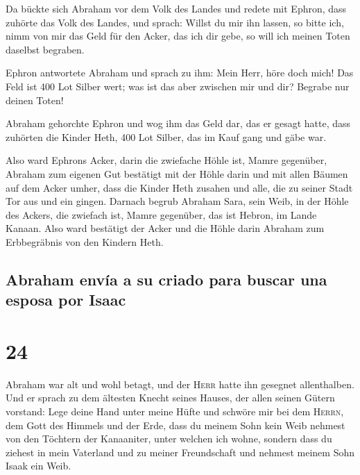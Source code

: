  Da bückte sich Abraham vor dem Volk des Landes
 und redete mit Ephron, dass zuhörte das Volk des Landes,
und sprach: Willst du mir ihn lassen, so bitte ich, nimm von mir das
Geld für den Acker, das ich dir gebe, so will ich meinen Toten daselbst
begraben.

 Ephron antwortete Abraham und sprach zu ihm:
 Mein Herr, höre doch mich! Das Feld ist 400 Lot Silber
wert; was ist das aber zwischen mir und dir? Begrabe nur deinen Toten!

 Abraham gehorchte Ephron und wog ihm das Geld dar, das
er gesagt hatte, dass zuhörten die Kinder Heth, 400 Lot Silber, das im
Kauf gang und gäbe war.

 Also ward Ephrons Acker, darin die zwiefache Höhle ist,
Mamre gegenüber, Abraham zum eigenen Gut bestätigt mit der Höhle darin
und mit allen Bäumen auf dem Acker umher,  dass die
Kinder Heth zusahen und alle, die zu seiner Stadt Tor aus und ein
gingen.  Darnach begrub Abraham Sara, sein Weib, in der
Höhle des Ackers, die zwiefach ist, Mamre gegenüber, das ist Hebron, im
Lande Kanaan.  Also ward bestätigt der Acker und die
Höhle darin Abraham zum Erbbegräbnis von den Kindern Heth.

\hypertarget{abraham-envuxeda-a-su-criado-para-buscar-una-esposa-por-isaac}{%
\subsection{Abraham envía a su criado para buscar una esposa por
Isaac}\label{abraham-envuxeda-a-su-criado-para-buscar-una-esposa-por-isaac}}

\hypertarget{section-23}{%
\section{24}\label{section-23}}

 Abraham war alt und wohl betagt, und der \textsc{Herr}
hatte ihn gesegnet allenthalben.  Und er sprach zu dem
ältesten Knecht seines Hauses, der allen seinen Gütern vorstand: Lege
deine Hand unter meine Hüfte  und schwöre mir bei dem
\textsc{Herrn}, dem Gott des Himmels und der Erde, dass du meinem Sohn
kein Weib nehmest von den Töchtern der Kanaaniter, unter welchen ich
wohne,  sondern dass du ziehest in mein Vaterland und zu
meiner Freundschaft und nehmest meinem Sohn Isaak ein Weib.

